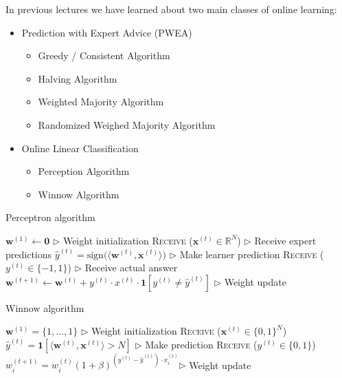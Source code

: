 \documentclass[11pt]{article}
\begin{document}

In previous lectures we have learned about two main classes of online learning:
\begin{itemize}
    \item Prediction with Expert Advice (PWEA)
    \begin{itemize}
        \item Greedy / Consistent Algorithm
        \item Halving Algorithm
        \item Weighted Majority Algorithm
        \item Randomized Weighed Majority Algorithm
    \end{itemize}
    \item Online Linear Classification
    \begin{itemize}
        \item Perception Algorithm
        \item Winnow Algorithm
    \end{itemize}
\end{itemize}

\begin{algorithm}[H]
\caption{Perceptron algorithm}
\label{algo:perceptron}
\begin{algorithmic}[1]
\State $\bm{w}^{(1)} \leftarrow \mathbf{0}$ \hfill $\triangleright$ Weight initialization
\State \textsc{Receive} ($\bm{x}^{(t)}\in \mathbb{R}^N$) \hfill $\triangleright$ Receive expert predictions
\State $\hat{y}^{(t)} = \text{sign}\Big(\langle \bm{w}^{(t)}, \bm{x}^{(t)} \rangle\Big)$ \hfill $\triangleright$ Make learner prediction
\State \textsc{Receive} ($y^{(t)}\in\{-1, 1\}$) \hfill $\triangleright$ Receive actual answer
\State $\bm{w}^{(t+1)}\leftarrow \bm{w}^{(t)} + y^{(t)} \cdot x^{(t)} \cdot\textbf{1}[y^{(t)}\neq \hat{y}^{(t)}] $ \hfill $\triangleright$ Weight update
\EndFor
\end{algorithmic}
\end{algorithm}

\begin{algorithm}[H]
\caption{Winnow algorithm}
\label{algo:winnow}
\begin{algorithmic}[1]
\State $\bm{w}^{(1)} = \{1, \ldots, 1\}$ \hfill $\triangleright$ Weight initialization
\State \textsc{Receive} ($\bm{x}^{(t)}\in \{0,1\}^N$) 
\State $\hat{y}^{(t)} = \mathbf{1}[\langle \bm{w}^{(t)}, \bm{x}^{(t)} \rangle > N]$ \hfill $\triangleright$ Make prediction
\State \textsc{Receive} ($y^{(t)}\in\{0, 1\}$) 
\State $w_i^{(t+1)}= w_i^{(t)}(1+\beta) ^ {(y^{(t)} - \hat{y}^{(t)})\cdot x_i^{(t)}} $\hfill $\triangleright$ Weight update
\EndFor
\end{algorithmic}
\end{algorithm}
\end{document}
